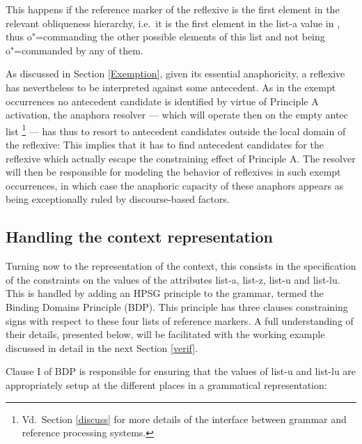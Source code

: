 \documentclass[output=paper
,modfonts
,nonflat]{langsci/langscibook}
\begin{document}
This happens 
if the reference marker of the reflexive
is the first element in the relevant
obliqueness hierarchy, i.e.\ it is the first element 
in the {\sc list-a} value in 
,
thus \mbox{o"=commanding} the other possible elements of this list and not being
\mbox{o"=commanded} by any of them. 



As discussed in Section \ref{Exemption}, given its essential anaphoricity,
a reflexive has nevertheless to be interpreted against some
antecedent. As in the exempt occurrences no antecedent candidate is 
identified by virtue of Principle A activation, the
anaphora resolver --- which will operate then on the empty {\sc antec} list%
%
\footnote{ 
Vd.\ Section \ref{discuss} for more details of the
interface between grammar and reference processing systems.}
%
--- has thus to resort
to antecedent candidates outside the local domain of the
reflexive: This implies that it has to find
antecedent candidates for the reflexive which actually escape 
the constraining effect of Principle A. The resolver will then be
responsible for modeling the behavior of reflexives 
in such exempt occurrences, in which case the
anaphoric capacity of these anaphors appears as being
exceptionally ruled by discourse-based factors.


\subsection{Handling the context representation}\label{contextRep}

Turning now to the representation of the context, this consists in the 
specification of the constraints on the values of the
attributes {\sc list-a}, {\sc list-z}, {\sc list-u}  and {\sc list-lu}. 
This is handled by adding
an HPSG principle to the grammar, termed 
the Binding Domains Principle (BDP). 
This principle has three
clauses constraining signs with respect to these four lists of reference
markers. A full understanding of their details, presented below, will be 
facilitated with the working example discussed in detail in the next Section \ref{verif}.

Clause I of BDP is responsible for ensuring
that the values of {\sc list-u} and \mbox{{\sc list-lu}} are appropriately
setup at the different places in a grammatical representation:
\end{document}
